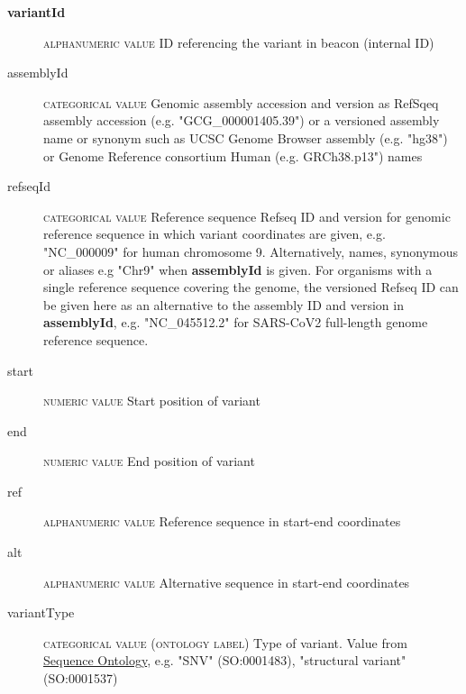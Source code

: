 \documentclass[a4paper, 10pt]{article}        %
\begin{document}
\begin{description}
	\item[\textbf{variantId}] {\textsc{alphanumeric value}} ID referencing the variant in beacon (internal ID)
	\item[assemblyId] {\textsc{categorical value}} Genomic assembly accession and version as RefSqeq assembly accession (e.g. "GCG\_000001405.39") or a versioned assembly name or synonym such as UCSC Genome Browser assembly (e.g. "hg38") or Genome Reference consortium Human (e.g. GRCh38.p13") names
 	\item[refseqId] {\textsc{categorical value}} Reference sequence Refseq ID and version for genomic reference sequence in which variant coordinates are given, e.g. "NC\_000009" for human chromosome 9. Alternatively, names, synonymous or aliases e.g "Chr9" when \textbf{assemblyId} is given. For organisms with a single reference sequence covering the genome, the versioned Refseq ID can be given here as an alternative to the assembly ID and version in \textbf{assemblyId}, e.g. "NC\_045512.2" for SARS-CoV2 full-length genome reference sequence. 
	\item[start] {\textsc{numeric value}} Start position of variant
	\item[end] {\textsc{numeric value}} End position of variant %
	\item[ref] {\textsc{alphanumeric value}} Reference sequence in start-end coordinates
	\item[alt] {\textsc{alphanumeric value}} Alternative sequence in start-end coordinates
	\item[variantType] {\textsc{categorical value (ontology label)}} Type of variant. Value from \href{http://www.sequenceontology.org}{Sequence Ontology}, e.g. "SNV" (SO:0001483), "structural variant"  (SO:0001537)
 \end{description}
 
\end{document}
